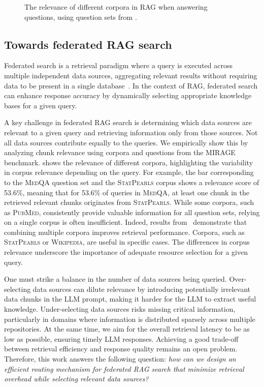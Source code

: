 \begin{figure}[t]
	\centering
	\caption{The relevance of different corpora in \ac{RAG} when answering questions, using question sets from \mirage.}
	\label{fig:routing}
\end{figure}

\subsection{Towards federated \ac{RAG} search}
Federated search is a retrieval paradigm where a query is executed across multiple independent data sources, aggregating relevant results without requiring data to be present in a single database~\cite{shokouhi2011federated}.
In the context of \ac{RAG}, federated search can enhance response accuracy by dynamically selecting appropriate knowledge bases for a given query.

A key challenge in federated \ac{RAG} search is determining which data sources are relevant to a given query and retrieving information only from those sources.
Not all data sources contribute equally to the queries.
We empirically show this by analyzing chunk relevance using corpora and questions from the \textsc{MIRAGE} benchmark.
 shows the relevance of different corpora, highlighting the variability in corpus relevance depending on the query.
For example, the bar corresponding to the \textsc{MedQA} question set and the \textsc{StatPearls} corpus shows a relevance score of 53.6\%, meaning that for 53.6\% of queries in \textsc{MedQA}, at least one chunk in the retrieved relevant chunks originates from \textsc{StatPearls}.
While some corpora, such as \textsc{PubMed}, consistently provide valuable information for all question sets, relying on a single corpus is often insufficient.
Indeed, results from~\cite{xiong-etal-2024-benchmarking} demonstrate that combining multiple corpora improves retrieval performance.
Corpora, such as \textsc{StatPearls} or \textsc{Wikipedia}, are useful in specific cases.
The differences in corpus relevance underscore the importance of adequate resource selection for a given query.


One must strike a balance in the number of data sources being queried.
Over-selecting data sources can dilute relevance by introducing potentially irrelevant data chunks in the \ac{LLM} prompt, making it harder for the \ac{LLM} to extract useful knowledge.
Under-selecting data sources risks missing critical information, particularly in domains where information is distributed sparsely across multiple repositories.
At the same time, we aim for the overall retrieval latency to be as low as possible, ensuring timely \ac{LLM} responses.
Achieving a good trade-off between retrieval efficiency and response quality remains an open problem.
Therefore, this work answers the following question: \emph{how can we design an efficient routing mechanism for federated \ac{RAG} search that minimize retrieval overhead while selecting relevant data sources?}

